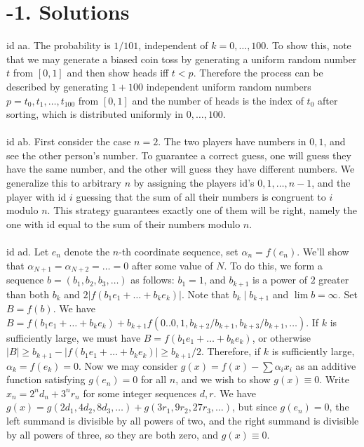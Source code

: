 \documentclass[oneside]{book}
\newcommand{\fit}[1]{\left( #1\right)}
\newcommand{\abs}[1]{\left\lvert #1\right\rvert}
\newcommand\chap[1]{%
  \chapter*{#1}%
  \addcontentsline{toc}{chapter}{#1}}
\begin{document}
\newpage
\chap{-1. Solutions}
id aa. The probability is $1/101$, independent of $k=0,\dots,100$. To show this, note that we may generate a biased coin toss by generating a uniform random number $t$ from $[0,1]$ and then show heads iff $t<p$. Therefore the process can be described by generating $1+100$ independent uniform random numbers $p=t_0,t_1,\dots,t_{100}$ from $[0,1]$ and the number of heads is the index of $t_0$ after sorting, which is distributed uniformly in $0,\dots,100$.  \\\\


id ab. First consider the case $n=2$. The two players have numbers in $0,1$, and see the other person's number. To guarantee a correct guess, one will guess they have the same number, and the other will guess they have different numbers. We generalize this to arbitrary $n$ by assigning the players id's $0,1,\dots,n-1$, and the player with id $i$ guessing that the sum of all their numbers is congruent to $i$ modulo $n$. This strategy guarantees exactly one of them will be right, namely the one with id equal to the sum of their numbers modulo $n$.     \\\\


id ad. Let $e_n$ denote the $n$-th coordinate sequence, set $\alpha_n=f(e_n)$. We'll show that $\alpha_{N+1}=\alpha_{N+2}=\dots = 0$ after some value of $N$. To do this, we form a sequence $b=(b_1,b_2,b_3,\dots)$ as follows: $b_1=1$, and $b_{k+1}$ is a power of $2$ greater than both $b_k$ and $2\abs{f(b_1e_1+\dots+b_ke_k)}$. Note that $b_k\mid b_{k+1}$ and $\lim b=\infty$. Set $B=f(b)$. We have $B=f(b_1e_1+\dots+b_ke_k)+b_{k+1}f\fit{0..0,1,{b_{k+2}}/{b_{k+1}},{b_{k+3}}/{b_{k+1}},\dots}$. If $k$ is sufficiently large, we must have $B=f(b_1e_1+\dots+b_ke_k)$, or otherwise $|B|\ge b_{k+1} - \abs{f(b_1e_1+\dots+b_ke_k)}\ge b_{k+1}/2$. Therefore, if $k$ is sufficiently large, $\alpha_k=f(e_k)=0$. Now we may consider $g(x)=f(x)-\sum \alpha_i x_i$ as an additive function satisfying $g(e_n)=0$ for all $n$, and we wish to show $g(x)\equiv 0$. Write $x_n = 2^n d_n + 3^n r_n$ for some integer sequences $d,r$. We have $g(x)=g(2d_1,4d_2,8d_3,\dots)+g(3r_1,9r_2,27r_3,\dots)$, but since $g(e_n)=0$, the left summand is divisible by all powers of two, and the right summand is divisible by all powers of three, so they are both zero, and $g(x)\equiv0$. \\\\
\end{document}
